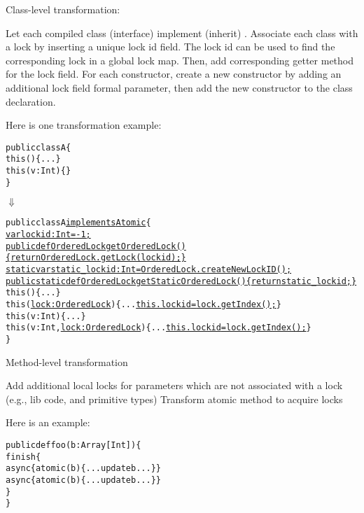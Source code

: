 \documentclass{article}
\begin{document}
\begin{enumerate}

\Item Class-level transformation:
\begin{itemize}
\Item Let each compiled class (interface) implement (inherit) .
\Item Associate each class with a lock by inserting  a unique lock id field. The lock id can be used to find the corresponding lock in a global lock map.  Then, add corresponding getter method for the lock field.
\Item For each constructor, create a new constructor by adding an additional lock field formal parameter, then add the new constructor to the class declaration.

Here is one transformation example:
\begin{CodeOut}
\begin{alltt}
public class A \{
   this() \{...\}
   this(v:Int) \{\}
\}
\end{alltt}
\end{CodeOut}

\hspace{10mm}$\Downarrow$

\begin{CodeOut}
\begin{alltt}
public class A \underline{implements Atomic} \{
   \underline{var lockid:Int = -1;}
   \underline{public def OrderedLock getOrderedLock() \{ return OrderedLock.getLock(lockid);\}}
   \underline{static var static\_lockid:Int = OrderedLock.createNewLockID();}
   \underline{public static def OrderedLock getStaticOrderedLock() \{ return static\_lockid;\}}
   this() \{...\}
   this(\underline{lock:OrderedLock}) \{... \underline{this.lockid = lock.getIndex();}\}
   this(v:Int) \{...\}
   this(v:Int, \underline{lock:OrderedLock}) \{... \underline{this.lockid = lock.getIndex();}\}
\}
\end{alltt}
\end{CodeOut}
\end{itemize}

\Item Method-level transformation

\begin{itemize}
\Item Add additional local locks for parameters which are not associated with a lock (e.g., lib code, and primitive types)
\Item Transform atomic method to acquire locks

Here is an example:
\begin{CodeOut}
\begin{alltt}
public def foo(b:Array[Int]) \{
    finish \{
       async \{atomic(b) \{...update b... \}\}
       async \{atomic(b) \{...update b... \}\}
    \}
\}
\end{alltt}
\end{CodeOut}


\end{itemize}
\end{enumerate}
\end{document}
